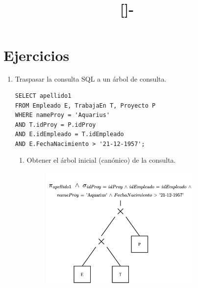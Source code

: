 \documentclass{templateNote}
\begin{document}

\title{[\asignatura]-\titulo}
\author{
    \autor
}
\portada
\margenes %

\section{Ejercicios}
\begin{enumerate}
    \item Traspasar la consulta SQL a un árbol de consulta.
    \begin{tcolorbox}[
        colback=Verde!30,
        colframe=Verde!90!black]
        \begin{verbatim}
SELECT apellido1
FROM Empleado E, TrabajaEn T, Proyecto P
WHERE nameProy = 'Aquarius' 
AND T.idProy = P.idProy
AND E.idEmpleado = T.idEmpleado
AND E.FechaNacimiento > '21-12-1957';
        \end{verbatim}
    \end{tcolorbox}
    \begin{enumerate}
        \item Obtener el árbol inicial (canónico) de la consulta.
        \begin{figure}[H]
            \centering
            \includegraphics[width=0.8\textwidth]{img/E1-ArbolCanonico.png}
        \end{figure}


\end{enumerate}
\end{enumerate}
\end{document}
